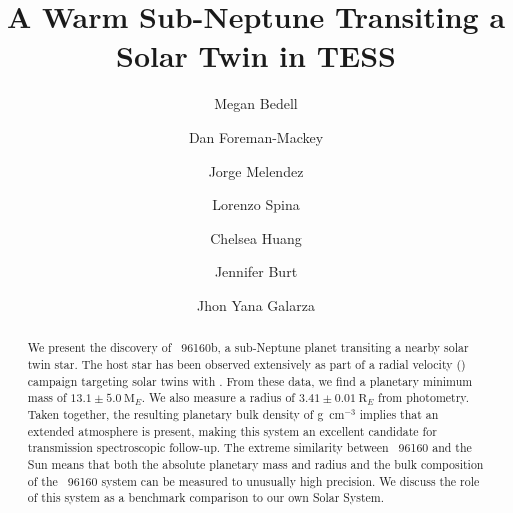 \documentclass[modern]{aastex62}
\newcommand{\hoststar}{\acronym{HIP}\ 96160\xspace}
\newcommand{\plname}{\acronym{HIP}\ 96160b\xspace}
\newcommand{\plmass}{$13.1 \pm 5.0\ \textrm{M}_{E}$\xspace}
\newcommand{\plradius}{$3.41 \pm 0.01\ \textrm{R}_{E}$\xspace}
\newcommand{\pldensity}{\todo{TODO} g~cm$^{-3}$\xspace}
\begin{document}
\sloppy\sloppypar\raggedbottom\frenchspacing %

\graphicspath{ {figures/} }

\title{A Warm Sub-Neptune Transiting a Solar Twin in TESS}

\author[0000-0001-9907-7742]{Megan Bedell}
\affiliation{\flatiron}

\author{Dan Foreman-Mackey}
\affiliation{\flatiron}

\author{Jorge Melendez}
\affiliation{\USP}

\author{Lorenzo Spina}

\author{Chelsea Huang}
\affiliation{\MIT}

\author{Jennifer Burt}
\affiliation{\MIT}

\author{Jhon Yana Galarza}
\affiliation{\USP}



\author{}





\begin{abstract}\noindent
We present the discovery of \plname, a sub-Neptune planet transiting a nearby solar twin star. 
The host star has been observed extensively as part of a radial velocity (\RV) campaign targeting solar twins with \HARPS. 
From these data, we find a planetary minimum mass of \plmass. 
We also measure a radius of \plradius from \TESS photometry. 
Taken together, the resulting planetary bulk density of \pldensity implies that an extended atmosphere is present, making this system an excellent candidate for transmission spectroscopic follow-up. 
The extreme similarity between \hoststar and the Sun means that both the absolute planetary mass and radius and the bulk composition of the \hoststar system can be measured to unusually high precision. 
We discuss the role of this system as a benchmark comparison to our own Solar System.


\end{abstract}
\end{document}
